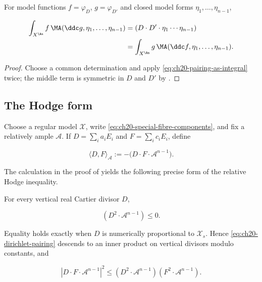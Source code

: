 \begin{corollary}
\label{cor:ch20-integration-by-parts}
For model functions $f=\varphi_D$, $g=\varphi_{D'}$ and closed model
forms $\eta_1,\ldots,\eta_{n-1}$,

\begin{equation}
\label{eq:ch20-ibp}
\begin{aligned}
 \int_{X^{\An}}f\,\MA(\ddc g,\eta_1,\ldots,\eta_{n-1})
 &=(D\cdot D'\cdot\eta_1\cdots\eta_{n-1})\\
 &=\int_{X^{\An}}g\,\MA(\ddc f,\eta_1,\ldots,\eta_{n-1}).
\end{aligned}
\end{equation}
\end{corollary}

\begin{proof}
Choose a common determination and apply
\eqref{eq:ch20-pairing-as-integral} twice; the middle term is symmetric in
$D$ and $D'$ by .
\end{proof}

\subsection{The Hodge form}
\label{sec:ch20-hodge}

Choose a regular model $\mathcal X$, write
\eqref{eq:ch20-special-fibre-components}, and fix a relatively ample
$\mathcal A$.  If $D=\sum_i a_iE_i$ and
$F=\sum_i c_iE_i$, define

\begin{equation}
\label{eq:ch20-dirichlet-pairing}
             \langle D,F\rangle_{\mathcal A}
             :=-\bigl(D\cdot F\cdot\mathcal A^{n-1}\bigr).
\end{equation}

The calculation in the proof of  yields the
following precise form of the relative Hodge inequality.

\begin{proposition}\label{prop:ch20-relative-hodge}
For every vertical real Cartier divisor $D$,

\begin{equation}
\label{eq:ch20-relative-hodge}
                    (D^2\cdot\mathcal A^{n-1})\leq0.
\end{equation}

Equality holds exactly when $D$ is numerically proportional to
$\mathcal X_s$.  Hence \eqref{eq:ch20-dirichlet-pairing} descends to an
inner product on vertical divisors modulo constants, and

\begin{equation}
\label{eq:ch20-hodge-cauchy-schwarz}
 |D\cdot F\cdot\mathcal A^{n-1}|^2
 \leq
 (D^2\cdot\mathcal A^{n-1})
 (F^2\cdot\mathcal A^{n-1}).
\end{equation}
\end{proposition}

